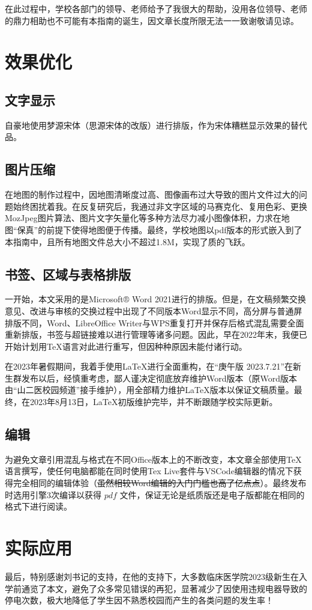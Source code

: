 在此过程中，学校各部门的领导、老师给予了我很大的帮助，没用各位领导、老师的鼎力相助也不可能有本指南的诞生，因文章长度所限无法一一致谢敬请见谅。

\section[效果优化]{效果优化}
\subsection[文字显示]{文字显示}
自豪地使用梦源宋体（思源宋体的改版）进行排版，作为宋体糟糕显示效果的替代品。

\subsection[图片压缩]{图片压缩}
在地图的制作过程中，因地图清晰度过高、图像画布过大导致的图片文件过大\footnotemark 的问题始终困扰着我。在反复研究后，我通过非文字区域的马赛克化、复用色彩、更换MozJpeg图片算法、图片文字矢量化等多种方法尽力减小图像体积，力求在地图“保真”的前提下使得地图便于传播。最终，学校地图以pdf版本的形式嵌入到了本指南中，且所有地图文件总大小不超过1.8M，实现了质的飞跃。

\subsection[书签、区域与表格排版]{书签、区域与表格排版}
一开始，本文采用的是Microsoft® Word 2021进行的排版。但是，在文稿频繁交换意见、改进与审核的交换过程中出现了不同版本Word显示不同，高分屏与普通屏排版不同，Word、LibreOffice Writer与WPS重复打开并保存后格式混乱需要全面重新排版，书签与超链接难以进行管理等诸多问题。因此，早在2022年末，我便已开始计划用TeX语言对此进行重写，但因种种原因未能付诸行动。

在2023年暑假期间，我着手使用LaTeX进行全面重构，在“庚午版 2023.7.21”在新生群发布以后，经慎重考虑，鄙人谨决定彻底放弃维护Word版本（原Word版本由“山二医校园频道”接手维护），用全部精力维护LaTeX版本以保证文稿质量。最终，在2023年8月13日，LaTeX初版维护完毕，并不断跟随学校实际更新。

\subsection[编辑]{编辑}
为避免文章引用混乱与格式在不同Office版本上的不断改变，本文章全部使用\TeX 语言撰写，使任何电脑都能在同时使用Tex Live套件与VSCode编辑器\footnotemark 的情况下获得完全相同的编辑体验（\sout{虽然相较Word编辑的入门门槛也高了亿点点}）。最终发布时选用\XeLaTeX 引擎3次编译以获得 $pdf$ 文件，保证无论是纸质版还是电子版都能在相同的格式下进行阅读。

\section[实际应用]{实际应用}
最后，特别感谢刘书记的支持，在他的支持下，大多数临床医学院2023级新生在入学前通览了本文，避免了众多常见错误的再犯，显著减少了因使用违规电器导致的停电次数，极大地降低了学生因不熟悉校园而产生的各类问题的发生率！
